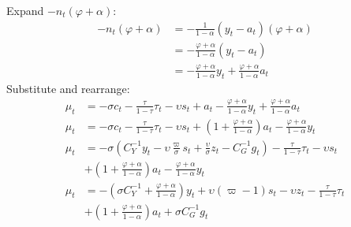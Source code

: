 Expand $-n_t(\varphi + \alpha)$:
\begin{align}
    -n_t(\varphi + \alpha) &= -\frac{1}{1-\alpha}(y_t - a_t)(\varphi + \alpha)\\
    &= -\frac{\varphi + \alpha}{1-\alpha}(y_t - a_t)\\
    &= -\frac{\varphi + \alpha}{1-\alpha}y_t + \frac{\varphi + \alpha}{1-\alpha}a_t
\end{align}
Substitute and rearrange:
\begin{align}
   \mu_t &= -\sigma c_t - \frac{\tau}{1-\tau}\tau_t - \upsilon s_t + a_t -\frac{\varphi + \alpha}{1-\alpha}y_t + \frac{\varphi + \alpha}{1-\alpha}a_t\\
   \mu_t &= -\sigma c_t - \frac{\tau}{1-\tau}\tau_t - \upsilon s_t + \left(1 + \frac{\varphi + \alpha}{1-\alpha}\right)a_t -\frac{\varphi + \alpha}{1-\alpha}y_t \\
   \mu_t &= -\sigma \left(C_Y^{-1} y_t - \upsilon \frac{\varpi}{\sigma} s_t + \frac{\upsilon}{\sigma}z_t - C_G^{-1} g_t\right) - \frac{\tau}{1-\tau}\tau_t - \upsilon s_t \nonumber \\
   &+ \left(1 + \frac{\varphi + \alpha}{1-\alpha}\right)a_t -\frac{\varphi + \alpha}{1-\alpha}y_t \\
   \mu_t &= -\left(\sigma C_Y^{-1} + \frac{\varphi + \alpha}{1-\alpha}\right)y_t + \upsilon \left(\varpi - 1\right)s_t - \upsilon z_t- \frac{\tau}{1-\tau}\tau_t \nonumber \\
   &+ \left(1 + \frac{\varphi + \alpha}{1-\alpha}\right)a_t + \sigma C_G^{-1} g_t \label{eq:appendix_average_markup_end}
\end{align}